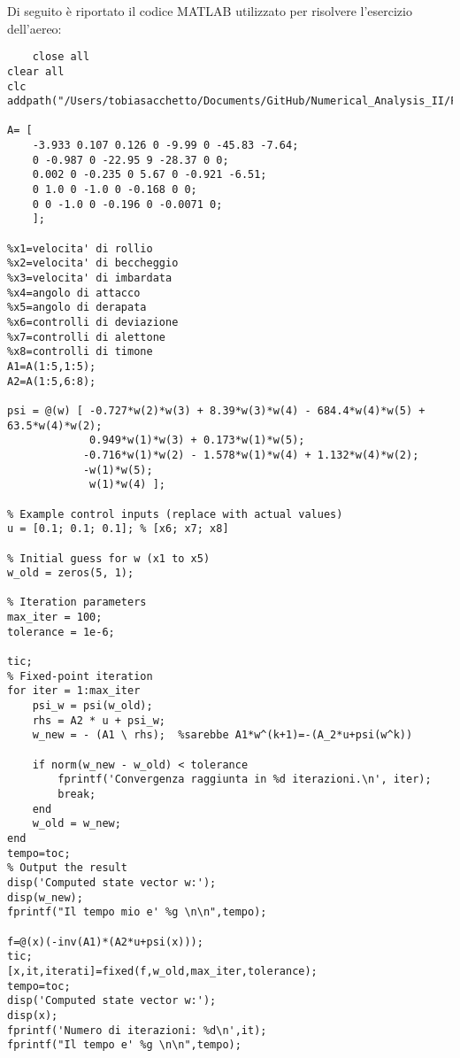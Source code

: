 \documentclass[11pt]{article}
\begin{document}
Di seguito è riportato il codice MATLAB utilizzato per risolvere l'esercizio dell'aereo:

\begin{lstlisting}
	close all
clear all
clc
addpath("/Users/tobiasacchetto/Documents/GitHub/Numerical_Analysis_II/Function");

A= [
    -3.933 0.107 0.126 0 -9.99 0 -45.83 -7.64;
    0 -0.987 0 -22.95 9 -28.37 0 0;
    0.002 0 -0.235 0 5.67 0 -0.921 -6.51;
    0 1.0 0 -1.0 0 -0.168 0 0;
    0 0 -1.0 0 -0.196 0 -0.0071 0;
    ];

%x1=velocita' di rollio
%x2=velocita' di beccheggio
%x3=velocita' di imbardata
%x4=angolo di attacco
%x5=angolo di derapata
%x6=controlli di deviazione
%x7=controlli di alettone
%x8=controlli di timone
A1=A(1:5,1:5);
A2=A(1:5,6:8);

psi = @(w) [ -0.727*w(2)*w(3) + 8.39*w(3)*w(4) - 684.4*w(4)*w(5) + 63.5*w(4)*w(2);
             0.949*w(1)*w(3) + 0.173*w(1)*w(5);
            -0.716*w(1)*w(2) - 1.578*w(1)*w(4) + 1.132*w(4)*w(2);
            -w(1)*w(5);
             w(1)*w(4) ]; 

% Example control inputs (replace with actual values)
u = [0.1; 0.1; 0.1]; % [x6; x7; x8]

% Initial guess for w (x1 to x5)
w_old = zeros(5, 1);

% Iteration parameters
max_iter = 100;
tolerance = 1e-6;

tic;
% Fixed-point iteration
for iter = 1:max_iter
    psi_w = psi(w_old);
    rhs = A2 * u + psi_w;
    w_new = - (A1 \ rhs);  %sarebbe A1*w^(k+1)=-(A_2*u+psi(w^k))
    
    if norm(w_new - w_old) < tolerance
        fprintf('Convergenza raggiunta in %d iterazioni.\n', iter);
        break;
    end
    w_old = w_new;
end
tempo=toc;
% Output the result
disp('Computed state vector w:');
disp(w_new);
fprintf("Il tempo mio e' %g \n\n",tempo);

f=@(x)(-inv(A1)*(A2*u+psi(x)));
tic;
[x,it,iterati]=fixed(f,w_old,max_iter,tolerance);
tempo=toc;
disp('Computed state vector w:');
disp(x);
fprintf('Numero di iterazioni: %d\n',it);
fprintf("Il tempo e' %g \n\n",tempo);
\end{lstlisting}
\end{document}
